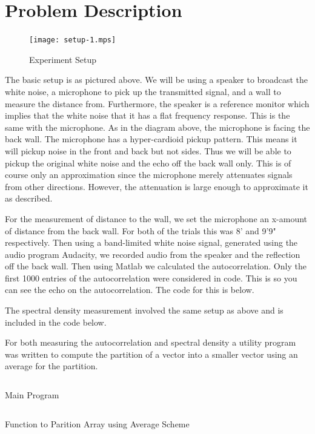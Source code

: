 \documentclass{article}
\begin{document}
      \section{Problem Description}
      \begin{figure}[H]
         \texttt{[image: setup-1.mps]}
         \caption{Experiment Setup}
      \end{figure}
      The basic setup is as pictured above. We will be using a speaker to
      broadcast the white noise, a microphone to pick up the transmitted signal,
      and a wall to measure the distance from. Furthermore, the speaker is
      a reference monitor which implies that the white noise that it has
      a flat frequency response. This is the same with the microphone.
      As in the diagram above, the microphone is facing the back wall. The
      microphone has a hyper-cardioid pickup pattern. This means it will
      pickup noise in the front and back but not sides. Thus we will be
      able to pickup the original white noise and the echo off the back
      wall only. This is of course only an approximation since the microphone
      merely attenuates signals from other directions. However, the
      attenuation is large enough to approximate it as described.

      For the measurement of distance to the wall, we set the microphone
      an x-amount of distance from the back wall. For both of the trials this
      was 8' and 9'9" respectively. Then using a band-limited white noise
      signal, generated using the audio program Audacity, we recorded audio
      from the speaker and the reflection off the back wall. Then using Matlab
      we calculated the autocorrelation. Only the first 1000 entries of the
      autocorrelation were considered in code. This is so you can see the
      echo on the autocorrelation.
      The code for this is below.

      The spectral density measurement involved the same setup as above
      and is included in the code below.

      For both measuring the autocorrelation and spectral density a
      utility program was written to compute the partition of a vector
      into a smaller vector using an average for the partition.

      \begin{listing}[H]
         \inputminted[linenos]{matlab}{../main.m}
         \caption{Main Program}
      \end{listing}
      \begin{listing}[H]
         \inputminted[linenos]{matlab}{../partition.m}
         \caption{Function to Parition Array using Average Scheme}
      \end{listing}
\end{document}
